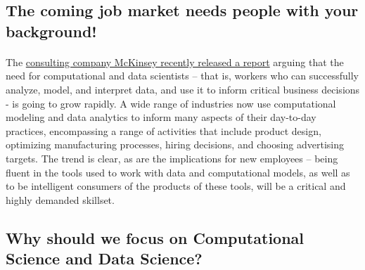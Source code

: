 \documentclass[%
oneside,                 %
final,                   %
10pt]{article}
\begin{document}
\noindent



\subsection*{The coming job market needs people with your background!}

\paragraph{}
The \href{{https://www.mckinsey.com/business-functions/mckinsey-analytics/our-insights/the-age-of-analytics-competing-in-a-data-driven-world}}{consulting company McKinsey recently released a report} arguing that the need for computational and data scientists – that is,
workers who can successfully analyze, model, and interpret data, and use it to inform critical business
decisions - is going to grow rapidly. A wide range of industries now use computational
modeling and data analytics to inform many aspects of their day-to-day practices, encompassing
a range of activities that include product design, optimizing manufacturing processes, hiring decisions,
and choosing advertising targets. The trend is clear, as are the implications for new employees
– being fluent in the tools used to work with data and computational models, as well as to be
intelligent consumers of the products of these tools, will be a critical and highly  demanded skillset.



\subsection*{Why should we focus on Computational Science and Data Science?}

\end{document}
